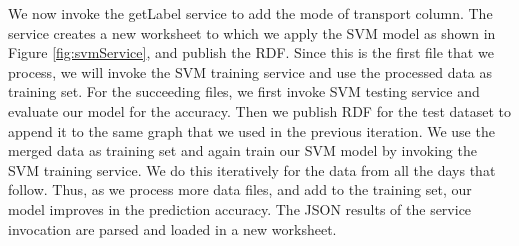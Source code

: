 We now invoke the getLabel service to add the mode of transport column. The service creates a new worksheet to which we apply the SVM model as shown in Figure \ref{fig:svmService}, and publish the RDF. Since this is the first file that we process, we will invoke the SVM training service and use the processed data as training set. For the succeeding files, we first invoke SVM testing service and evaluate our model for the accuracy. Then we publish RDF for the test dataset to append it to the same graph that we used in the previous iteration. We use the merged data as training set and again train our SVM model by invoking the SVM training service. We do this iteratively for the data from all the days that follow. Thus, as we process more data files, and add to the training set, our model improves in the prediction accuracy. The JSON results of the service invocation are parsed and loaded in a new worksheet. 